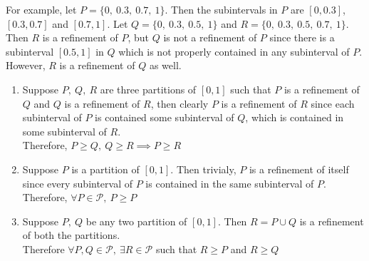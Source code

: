 \begin{remark}
\begin{enumerate}
			For example, let \( P = \{ 0,\ 0.3,\ 0.7,\ 1 \} \). Then the subintervals in \( P \) are \( [0,0.3] \), \( [0.3,0.7] \) and \( [0.7,1] \). Let \( Q = \{ 0,\ 0.3,\ 0.5,\ 1 \} \) and \( R = \{ 0,\ 0.3,\ 0.5,\ 0.7,\ 1 \} \). Then \( R \) is a refinement of \( P \), but \( Q \) is not a refinement of \( P \) since there is a subinterval \( [0.5,1] \) in \( Q \) which is not properly contained in any subinterval of \( P \). However, \( R \) is a refinement of \( Q \) as well.
			\begin{enumerate}
				\item Suppose \(P,\ Q,\ R \)  are three partitions of \( [0,1] \) such that \( P \) is a refinement of \( Q \) and \( Q \) is a refinement of \( R \), then clearly \( P \) is a refinement of \( R \) since each subinterval of \( P \) is contained some subinterval of \( Q \), which is contained in some subinterval of \( R \).\\
					Therefore, \( P \ge Q,\ Q \ge R \implies P \ge R \)
				\item Suppose \( P \) is a partition of \( [0,1] \). Then trivialy, \( P \) is a refinement of itself since every subinterval of \( P \) is contained in the same subinterval of \( P \).\\
					Therefore, \( \forall P \in \mathcal{P},\ P \ge P \)
				\item Suppose \( P,\ Q \) be any two partition of \( [0,1] \). Then \( R = P \cup Q \) is a refinement of both the partitions.\\
					Therefore \( \forall P,Q \in \mathcal{P},\ \exists R \in \mathcal{P} \) such that \( R \ge P \) and \( R \ge Q \)
			\end{enumerate}
	\end{enumerate}
\end{remark}

